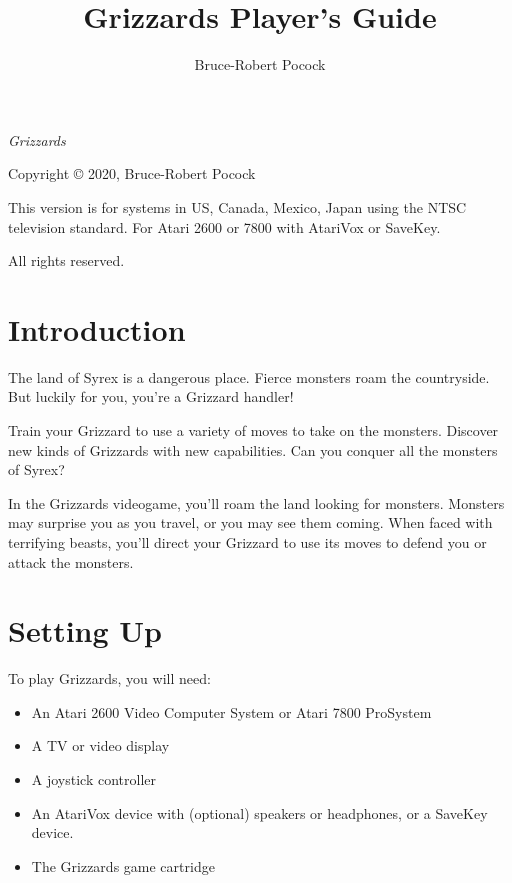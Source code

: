 \documentclass[10pt,twoside,openright]{memoir}
\title{Grizzards Player's Guide}
\author{Bruce-Robert Pocock}
\makeatletter
\newcommand\TV{NTSC}
\newcommand\REGION{US, Canada, Mexico, Japan}
\newcommand\TV{PAL}
\newcommand\REGION{Europe (except France)}
\newcommand\TV{SECAM}
\newcommand\REGION{France, Russia, Africa}
\def\maketitle{%
  \null
  \thispagestyle{empty}%
  \vfill
  \begin{center}\leavevmode
    \normalfont
    {\LARGE\raggedleft \@author\par}%
    \hrulefill\par
    {\huge\raggedright \@title\par}%
    \vskip 1cm
  \end{center}%
  \vfill
  \null
  \cleardoublepage
  }
\makeatother
\begin{document}
\let\cleardoublepage\clearpage


\maketitle

\frontmatter

\null\vfill

\begin{flushleft}
\textit{Grizzards}


Copyright © 2020, Bruce-Robert Pocock

This version is for systems in \REGION{} using the \TV{} television
standard. For Atari 2600 or 7800 with AtariVox or SaveKey.




\thedate

\bigskip

All rights reserved.

\end{flushleft}
\let\cleardoublepage\clearpage

\mainmatter

\chapter{Introduction}

The land of Syrex is a dangerous place. Fierce monsters roam the countryside.
But luckily for you, you're a Grizzard handler!

Train your Grizzard to use a variety of moves to take on the monsters.
Discover new kinds of Grizzards with new capabilities. Can you conquer all
the monsters of Syrex?

In the Grizzards videogame, you'll roam the land looking for monsters.
Monsters may surprise you as you travel, or you may see them coming. When
faced with terrifying beasts, you'll direct your Grizzard to use its moves
to defend you or attack the monsters.


\chapter{Setting Up}

To play Grizzards, you will need:

\begin{itemize}
\item An Atari 2600 Video Computer System or Atari 7800 ProSystem
\item A TV or video display
\item A joystick controller
\item  An AtariVox  device with  (optional) speakers  or headphones,  or
  a SaveKey device.
\item The Grizzards game cartridge
\end{itemize}
\end{document}
